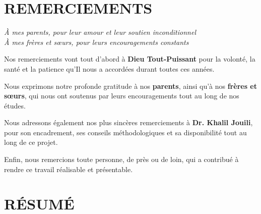 \documentclass[oneside, french, a4paper, 12pt, reqno]{book}
\begin{document}
\chapter*{REMERCIEMENTS}
\thispagestyle{plain}

\vspace{0.5cm}
\begin{center}
    \Large\itshape
    À mes parents, pour leur amour et leur soutien inconditionnel\\[0.5cm]
    À mes frères et sœurs, pour leurs encouragements constants
\end{center}
\vspace{1cm}

\begin{large}
Nos remerciements vont tout d'abord à \textbf{Dieu Tout-Puissant} pour la volonté, la santé et la patience qu'Il nous a accordées durant toutes ces années.

Nous exprimons notre profonde gratitude à nos \textbf{parents}, ainsi qu'à nos \textbf{frères et sœurs}, qui nous ont soutenus par leurs encouragements tout au long de nos études.

Nous adressons également nos plus sincères remerciements à \textbf{Dr. Khalil Jouili}, pour son encadrement, ses conseils méthodologiques et sa disponibilité tout au long de ce projet.

Enfin, nous remercions toute personne, de près ou de loin, qui a contribué à rendre ce travail réalisable et présentable.
\end{large}

\chapter*{RÉSUMÉ}
\thispagestyle{plain}
\end{document}
